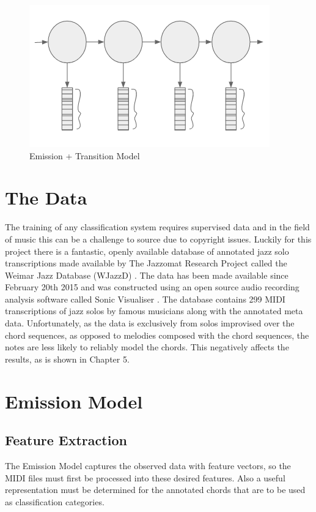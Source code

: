 \documentclass[bsc,singlespacing,parskip,deptreport,twoside,frontabs]{infthesis}
\begin{document}
\begin{figure}
  \caption{Emission + Transition Model}
  \centering
    \includegraphics{seq}
\end{figure}

\section{The Data}

The training of any classification system requires supervised data and in the field of music this can be a challenge to source due to copyright issues. Luckily for this project there is a fantastic, openly available database of annotated jazz solo transcriptions made available by The Jazzomat Research Project called the Weimar Jazz Database (WJazzD) \cite[]{wjazz}. The data has been made available since February 20th 2015 and was constructed using an open source audio recording analysis software called Sonic Visualiser \cite[]{sv}. The database contains 299 MIDI transcriptions of jazz solos by famous musicians along with the annotated meta data. Unfortunately, as the data is exclusively from solos improvised over the chord sequences, as opposed to melodies composed with the chord sequences, the notes are less likely to reliably model the chords. This negatively affects the results, as is shown in Chapter 5.

\section{Emission Model}

\subsection{Feature Extraction}

The Emission Model captures the observed data with feature vectors, so the MIDI files must first be processed into these desired features. Also a useful representation must be determined for the annotated chords that are to be used as classification categories.
\end{document}

